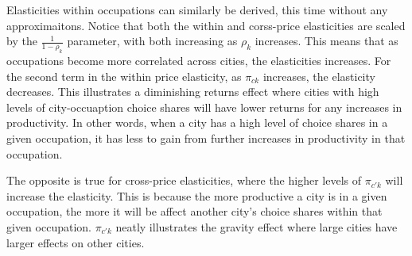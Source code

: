 \documentclass[10pt]{article}
\begin{document}
Elasticities within occupations can similarly be derived, this time without any approximaitons. Notice that both the within and corss-price elasticities are scaled by the $\frac{1}{1 - \rho_k}$ parameter, with both increasing as $\rho_k$ increases. This means that as occupations become more correlated across cities, the elasticities increases. For the second term in the within price elasticity, as $\pi_{ck}$ increases, the elasticity decreases. This illustrates a diminishing returns effect where cities with high levels of city-occuaption choice shares will have lower returns for any increases in productivity. In other words, when a city has a high level of choice shares in a given occupation, it has less to gain from further increases in productivity in that occupation.

The opposite is true for cross-price elasticities, where the higher levels of $\pi_{c'k}$ will increase the elasticity. This is because the more productive a city is in a given occupation, the more it will be affect another city's choice shares within that given occupation. $\pi_{c'k}$ neatly illustrates the gravity effect where large cities have larger effects on other cities.
\end{document}
